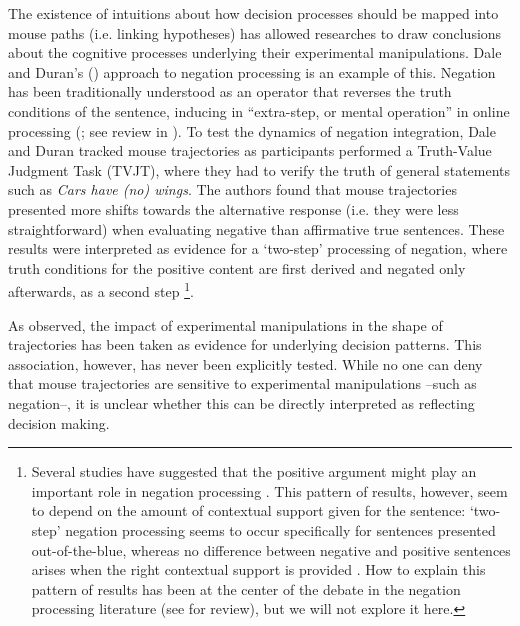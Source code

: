 \documentclass{article}
\begin{document}
The existence of intuitions about how decision processes should be mapped into mouse paths (i.e. linking hypotheses) has allowed researches to draw conclusions about the cognitive processes underlying their experimental manipulations. Dale and Duran's (\citeyear{Dale2011}) approach to negation processing is an example of this.   
Negation has been traditionally understood as an operator that reverses the truth conditions of the sentence, inducing in ``extra-step, or mental operation'' in online processing (\citealp{wason1965contexts,wason1972psychology}; see review in \citealp{Tian2016}). %
To test the dynamics of negation integration, Dale and Duran tracked mouse trajectories as participants performed a Truth-Value Judgment Task (TVJT), where they had to verify the truth of general statements such as \textit{Cars have (no) wings}.
%
The authors found that mouse trajectories presented more shifts towards the alternative response (i.e. they were less straightforward) when evaluating negative than affirmative true sentences. These results were interpreted as evidence for a `two-step' processing of negation, where truth conditions for the positive content are first derived and negated only afterwards, as a second step%
%
\footnote{Several studies have suggested that the positive argument might play an important role in negation processing \citep[among others]{kaup2007experiential,ludtke2008event}.  
This pattern of results, however, seem to depend on the amount of contextual support given for the sentence: `two-step' negation processing seems to occur specifically for sentences presented out-of-the-blue, whereas no difference between negative and positive sentences arises when the right contextual support is provided \citep{nieuwland2008truth,tian2010we}. How to explain this pattern of results has been at the center of the debate in the negation processing literature (see \citealp{Tian2016} for review), but we will not explore it here.}.

As observed, the impact of experimental manipulations in the shape of trajectories has been taken as evidence for underlying decision patterns. This association, however, has never been explicitly tested. While no one can deny that mouse trajectories are sensitive to experimental manipulations --such as negation--, it is unclear whether this can be directly interpreted as reflecting decision making. 
\end{document}
